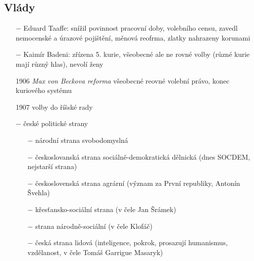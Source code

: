 \documentclass{article}
\begin{document}
\subsection*{Vlády}
\begin{itemize}
    \vspace{-0.5em}
    \setlength\itemsep{0.15em}
    \item[$-$] Eduard Taaffe: snížil povinnost pracovní doby, volebního censu, zavedl nemocenské a úrazové pojištění, měnová reofrma, zlatky nahrazeny korunami
    \item[$-$] Kaimír Badeni: zřízena 5. kurie, všeobecné ale ne rovné volby (různé kurie mají různý hlas), nevolí ženy
    \item[1906] \textit{Max von Beckova reforma} všeobecné reovné volební právo, konec kuriového systému
    \item[1907] volby do říšské rady
    \item[$-$] české politické strany \begin{itemize}
        \vspace{-0.5em}
        \setlength\itemsep{0.15em}
        \item[$-$] národní strana svobodomyslná
        \item[$-$] českoslovanská strana sociálně-demokratická dělnická (dnes SOCDEM, nejstarší strana)
        \item[$-$] československá strana agrární (význam za První republiky, Antonín Švehla)
        \item[$-$] křesťansko-sociální strana (v čele Jan Šrámek)
        \item[$-$] strana národně-sociální (v čele Klofáč)
        \item[$-$] česká strana lidová (inteligence, pokrok, prosazují humanismus, vzdělanost, v čele Tomáš Garrigue Masaryk)
    \end{itemize}
\end{itemize}
\end{document}
